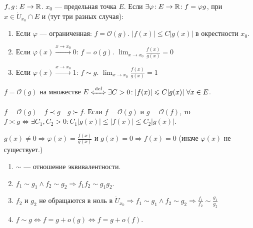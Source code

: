 \begin{definition}
	$f, g\!: E \to \mathbb{R}$.  $x_0$ --- предельная точка  $E$. Если $\exists \varphi\!:E \to \mathbb{R}\!: f = \varphi g$, при $x \in \dot{U}_{x_0} \cap E$ и (тут три разных случая):
     \begin{enumerate}
         \item Если $\varphi$ --- ограниченная:  $f = \mathcal{O}(g)$. $|f(x)| \le C|g(x)|$ в окрестности $x_0$.
         \item  Если $\varphi(x) \xrightarrow{x \to x_0} 0$:  $f = o(g)$. $\lim_{x \to x_0} \frac{f(x)}{g(x)} = 0$
         \item  Если $\varphi(x) \xrightarrow{x \to x_0} 1$:  $f \sim g$. $\lim_{x \to x_0} \frac{f(x)}{g(x)} = 1$
    \end{enumerate}
\end{definition}
\begin{definition}
    $f = \mathcal{O}(g)$ на множестве  $E$  $\xLeftrightarrow{\text{def}} \exists C > 0\!: |f(x)| \le C|g(x)|\ \forall x \in E$.
\end{definition}
\begin{definition}
    $f = \mathcal{O}(g) \quad f \prec g \quad g \succ f$. Если  $f = \mathcal{O}(g)$ и  $g = \mathcal{O}(f)$, то  $f \asymp g \iff \exists C_1, C_2 > 0\!: C_1|g(x)| \le |f(x)| \le C_2|g(x)|$.
\end{definition}
\begin{remark}
    $g(x) \neq 0 \Rightarrow \varphi(x) = \frac{f(x)}{g(x)}$ и $g(x) = 0 \Rightarrow f(x) = 0$ (иначе $\varphi(x)$ не существует.)
\end{remark}
\begin{properties}
    \begin{enumerate}
        \item $\sim$ --- отношение эквивалентности.
        \item  $f_1 \sim g_1 \land f_2 \sim g_2 \Rightarrow f_1f_2 \sim g_1g_2$.
	\item $f_2$ и  $g_2$ не обращаются в ноль в  $\dot{U}_{x_0} \Rightarrow f_1 \sim g_1 \land f_2 \sim g_2 \Rightarrow \frac{f_1}{f_2} \sim \frac{g_1}{g_2}$
        \item $f \sim g \iff f = g + o(g) \iff f = g + o(f)$.
    \end{enumerate}
\end{properties}
